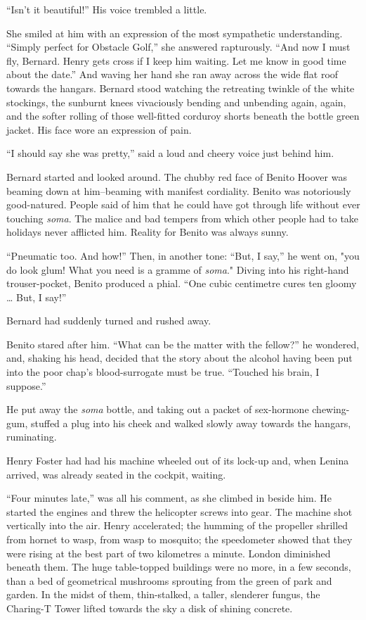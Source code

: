 \documentclass[12pt]{report}
\begin{document}
``Isn't it beautiful!'' His voice trembled a little.

She smiled at him with an expression of the most sympathetic
understanding. ``Simply perfect for Obstacle Golf,'' she answered
rapturously. ``And now I must fly, Bernard. Henry gets cross if I keep
him waiting. Let me know in good time about the date.'' And waving her
hand she ran away across the wide flat roof towards the hangars. Bernard
stood watching the retreating twinkle of the white stockings, the
sunburnt knees vivaciously bending and unbending again, again, and the
softer rolling of those well-fitted corduroy shorts beneath the bottle
green jacket. His face wore an expression of pain.

``I should say she was pretty,'' said a loud and cheery voice just
behind him.

Bernard started and looked around. The chubby red face of Benito Hoover
was beaming down at him--beaming with manifest cordiality. Benito was
notoriously good-natured. People said of him that he could have got
through life without ever touching \emph{soma}. The malice and bad
tempers from which other people had to take holidays never afflicted
him. Reality for Benito was always sunny.

``Pneumatic too. And how!'' Then, in another tone: ``But, I say,'' he
went on, "you do look glum! What you need is a gramme of \emph{soma}."
Diving into his right-hand trouser-pocket, Benito produced a phial.
``One cubic centimetre cures ten gloomy \ldots{} But, I say!''

Bernard had suddenly turned and rushed away.

Benito stared after him. ``What can be the matter with the fellow?'' he
wondered, and, shaking his head, decided that the story about the
alcohol having been put into the poor chap's blood-surrogate must be
true. ``Touched his brain, I suppose.''

He put away the \emph{soma} bottle, and taking out a packet of
sex-hormone chewing-gum, stuffed a plug into his cheek and walked slowly
away towards the hangars, ruminating.

Henry Foster had had his machine wheeled out of its lock-up and, when
Lenina arrived, was already seated in the cockpit, waiting.

``Four minutes late,'' was all his comment, as she climbed in beside
him. He started the engines and threw the helicopter screws into gear.
The machine shot vertically into the air. Henry accelerated; the humming
of the propeller shrilled from hornet to wasp, from wasp to mosquito;
the speedometer showed that they were rising at the best part of two
kilometres a minute. London diminished beneath them. The huge
table-topped buildings were no more, in a few seconds, than a bed of
geometrical mushrooms sprouting from the green of park and garden. In
the midst of them, thin-stalked, a taller, slenderer fungus, the
Charing-T Tower lifted towards the sky a disk of shining concrete.
\end{document}
